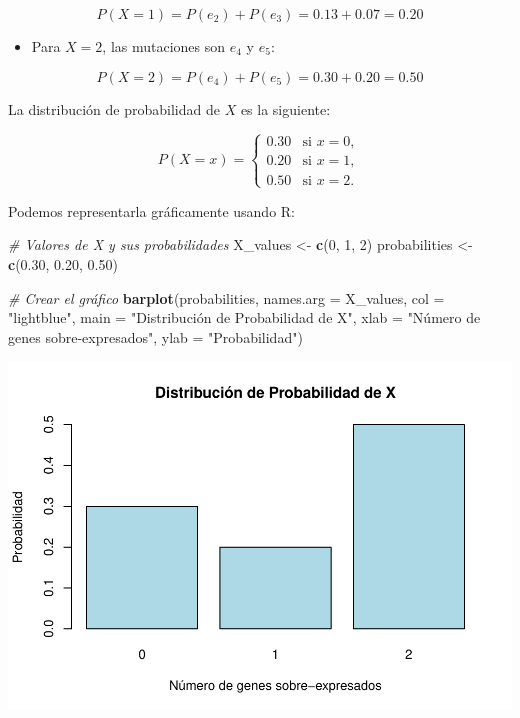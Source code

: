 \documentclass[
]{article}
\newenvironment{Shaded}{\begin{snugshade}}{\end{snugshade}}
\newcommand{\AttributeTok}[1]{\textcolor[rgb]{0.13,0.29,0.53}{#1}}
\newcommand{\CommentTok}[1]{\textcolor[rgb]{0.56,0.35,0.01}{\textit{#1}}}
\newcommand{\DecValTok}[1]{\textcolor[rgb]{0.00,0.00,0.81}{#1}}
\newcommand{\FloatTok}[1]{\textcolor[rgb]{0.00,0.00,0.81}{#1}}
\newcommand{\FunctionTok}[1]{\textcolor[rgb]{0.13,0.29,0.53}{\textbf{#1}}}
\newcommand{\NormalTok}[1]{#1}
\newcommand{\OtherTok}[1]{\textcolor[rgb]{0.56,0.35,0.01}{#1}}
\newcommand{\StringTok}[1]{\textcolor[rgb]{0.31,0.60,0.02}{#1}}
\providecommand{\tightlist}{%
  \setlength{\itemsep}{0pt}\setlength{\parskip}{0pt}}
\begin{document}
\[
P(X = 1) = P(e_2) + P(e_3) = 0.13 + 0.07 = 0.20
\]

\begin{itemize}
\tightlist
\item
  Para \(X = 2\), las mutaciones son \(e_4\) y \(e_5\):
\end{itemize}

\[
P(X = 2) = P(e_4) + P(e_5) = 0.30 + 0.20 = 0.50
\]

La distribución de probabilidad de \(X\) es la siguiente:

\[
P(X = x) =
\begin{cases}
0.30 & \text{si } x = 0, \\
0.20 & \text{si } x = 1, \\
0.50 & \text{si } x = 2.
\end{cases}
\]

Podemos representarla gráficamente usando R:

\begin{Shaded}
\begin{Highlighting}[]
\CommentTok{\# Valores de X y sus probabilidades}
\NormalTok{X\_values }\OtherTok{\textless{}{-}} \FunctionTok{c}\NormalTok{(}\DecValTok{0}\NormalTok{, }\DecValTok{1}\NormalTok{, }\DecValTok{2}\NormalTok{)}
\NormalTok{probabilities }\OtherTok{\textless{}{-}} \FunctionTok{c}\NormalTok{(}\FloatTok{0.30}\NormalTok{, }\FloatTok{0.20}\NormalTok{, }\FloatTok{0.50}\NormalTok{)}

\CommentTok{\# Crear el gráfico}
\FunctionTok{barplot}\NormalTok{(probabilities, }\AttributeTok{names.arg =}\NormalTok{ X\_values, }\AttributeTok{col =} \StringTok{"lightblue"}\NormalTok{,}
        \AttributeTok{main =} \StringTok{"Distribución de Probabilidad de X"}\NormalTok{,}
        \AttributeTok{xlab =} \StringTok{"Número de genes sobre{-}expresados"}\NormalTok{, }\AttributeTok{ylab =} \StringTok{"Probabilidad"}\NormalTok{)}
\end{Highlighting}
\end{Shaded}

\includegraphics{Ejercicios-de-Inferencia-Estadistica_files/figure-latex/unnamed-chunk-7-1.pdf}
\end{document}
